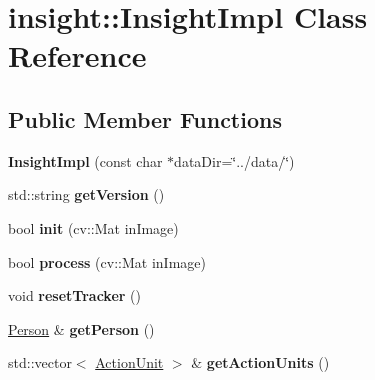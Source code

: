 \hypertarget{classinsight_1_1InsightImpl}{}\section{insight\+:\+:Insight\+Impl Class Reference}
\label{classinsight_1_1InsightImpl}
\subsection*{Public Member Functions}
\begin{DoxyCompactItemize}
\item 
\hypertarget{classinsight_1_1InsightImpl_a336ada77b0786eb88060060e61ef1a4f}{}{\bfseries Insight\+Impl} (const char $\ast$data\+Dir=\char`\"{}../data/\char`\"{})\label{classinsight_1_1InsightImpl_a336ada77b0786eb88060060e61ef1a4f}

\item 
\hypertarget{classinsight_1_1InsightImpl_aef7d79c1fc33957a8d4910a8aa632e69}{}std\+::string {\bfseries get\+Version} ()\label{classinsight_1_1InsightImpl_aef7d79c1fc33957a8d4910a8aa632e69}

\item 
\hypertarget{classinsight_1_1InsightImpl_a00409042437771438276c4f4df4817fc}{}bool {\bfseries init} (cv\+::\+Mat in\+Image)\label{classinsight_1_1InsightImpl_a00409042437771438276c4f4df4817fc}

\item 
\hypertarget{classinsight_1_1InsightImpl_ae85d1a26941484e27922655cac213e00}{}bool {\bfseries process} (cv\+::\+Mat in\+Image)\label{classinsight_1_1InsightImpl_ae85d1a26941484e27922655cac213e00}

\item 
\hypertarget{classinsight_1_1InsightImpl_a8666f3af3266ec88c08000c228395caa}{}void {\bfseries reset\+Tracker} ()\label{classinsight_1_1InsightImpl_a8666f3af3266ec88c08000c228395caa}

\item 
\hypertarget{classinsight_1_1InsightImpl_a501ab8d4db96aa16eb5c3ad1e812eb2d}{}\hyperlink{classinsight_1_1Person}{Person} \& {\bfseries get\+Person} ()\label{classinsight_1_1InsightImpl_a501ab8d4db96aa16eb5c3ad1e812eb2d}

\item 
\hypertarget{classinsight_1_1InsightImpl_a299bc65bcc032844abe0e33916d2a490}{}std\+::vector$<$ \hyperlink{classinsight_1_1ActionUnit}{Action\+Unit} $>$ \& {\bfseries get\+Action\+Units} ()\label{classinsight_1_1InsightImpl_a299bc65bcc032844abe0e33916d2a490}

\end{DoxyCompactItemize}
